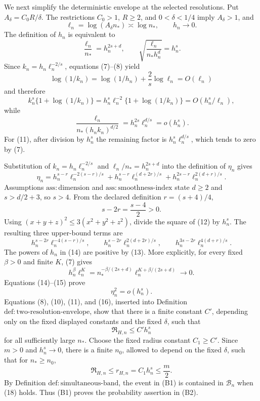 We next simplify the deterministic envelope at the selected resolutions.  Put \(A_\delta=C_0R/\delta\).  The restrictions \(C_0>1\), \(R\ge2\), and \(0<\delta<1/4\) imply \(A_\delta>1\), and
\[
 \ell_n=\log(A_\delta n_\ast)\asymp\log n_\ast,
 \qquad
 h_n\longrightarrow0.
 \tag{7}
\]
The definition of \(h_n\) is equivalent to
\[
 \frac{\ell_n}{n_\ast}=h_n^{2s+d},
 \qquad
 \sqrt{\frac{\ell_n}{n_\ast h_n^d}}=h_n^s.
 \tag{8}
\]
Since \(k_n=h_n\ell_n^{-2/s}\), equations (7)--(8) yield
\[
 \log(1/k_n)=\log(1/h_n)+\frac2s\log\ell_n=O(\ell_n)
 \tag{9}
\]
and therefore
\[
 k_n^s\{1+\log(1/k_n)\}
 =h_n^s\ell_n^{-2}\{1+\log(1/k_n)\}
 =O(h_n^s/\ell_n),
 \tag{10}
\]
while
\[
 \frac{\ell_n}{n_\ast(h_nk_n)^{d/2}}
 =h_n^{2s}\ell_n^{d/s}=o(h_n^s).
 \tag{11}
\]
For (11), after division by \(h_n^s\) the remaining factor is \(h_n^s\ell_n^{d/s}\), which tends to zero by (7).

Substitution of \(k_n=h_n\ell_n^{-2/s}\) and \(\ell_n/n_\ast=h_n^{2s+d}\) into the definition of \(\eta_n\) gives
\[
 \eta_n
 =h_n^{s-r}\ell_n^{-2(s-r)/s}
 +h_n^{s-r}\ell_n^{(d+2r)/s}
 +h_n^{2s-r}\ell_n^{2(d+r)/s}.
 \tag{12}
\]
Assumptions \(\mathrm{ass:dimension}\) and \(\mathrm{ass:smoothness\text{-}index}\) state \(d\ge2\) and \(s>d/2+3\), so \(s>4\).  From the declared definition \(r=(s+4)/4\),
\[
 s-2r=\frac{s-4}{2}>0.
 \tag{13}
\]
Using \((x+y+z)^2\le3(x^2+y^2+z^2)\), divide the square of (12) by \(h_n^s\).  The resulting three upper-bound terms are
\[
 h_n^{s-2r}\ell_n^{-4(s-r)/s},
 \qquad
 h_n^{s-2r}\ell_n^{2(d+2r)/s},
 \qquad
 h_n^{3s-2r}\ell_n^{4(d+r)/s}.
 \tag{14}
\]
The powers of \(h_n\) in (14) are positive by (13).  More explicitly, for every fixed \(\beta>0\) and finite \(K\), (7) gives
\[
 h_n^\beta\ell_n^K
 =n_\ast^{-\beta/(2s+d)}
   \ell_n^{K+\beta/(2s+d)}\longrightarrow0.
 \tag{15}
\]
Equations (14)--(15) prove
\[
 \eta_n^2=o(h_n^s).
 \tag{16}
\]
Equations (8), (10), (11), and (16), inserted into Definition \(\mathrm{def:two\text{-}resolution\text{-}envelope}\), show that there is a finite constant \(C'\), depending only on the fixed displayed constants and the fixed \(\delta\), such that
\[
 \mathfrak R_{H,n}\le C'h_n^s
 \tag{17}
\]
for all sufficiently large \(n_\ast\).  Choose the fixed radius constant \(C_1\ge C'\).  Since \(m>0\) and \(h_n^s\to0\), there is a finite \(n_0\), allowed to depend on the fixed \(\delta\), such that for \(n_\ast\ge n_0\),
\[
 \mathfrak R_{H,n}\le r_{H,n}=C_1h_n^s\le\frac m2.
 \tag{18}
\]
By Definition \(\mathrm{def:simultaneous\text{-}band}\), the event in (B1) is contained in \(\mathcal B_n\) when (18) holds.  Thus (B1) proves the probability assertion in (B2).

